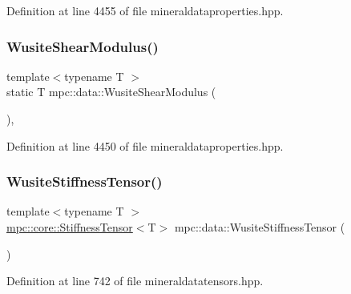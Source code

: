 Definition at line 4455 of file mineraldataproperties.\+hpp.

\mbox{\label{namespacempc_1_1data_a93bda58f4ced43c1b4ea8885f40eb3c9}} 
\subsubsection{\texorpdfstring{Wusite\+Shear\+Modulus()}{WusiteShearModulus()}}
{\footnotesize\ttfamily template$<$typename T $>$ \\
static T mpc\+::data\+::\+Wusite\+Shear\+Modulus (\begin{DoxyParamCaption}{ }\end{DoxyParamCaption})\hspace{0.3cm}{\ttfamily [inline]}, {\ttfamily [static]}}



Definition at line 4450 of file mineraldataproperties.\+hpp.

\mbox{\label{namespacempc_1_1data_a6600e136fcd24a2952392dc953bd2559}} 
\subsubsection{\texorpdfstring{Wusite\+Stiffness\+Tensor()}{WusiteStiffnessTensor()}}
{\footnotesize\ttfamily template$<$typename T $>$ \\
\mbox{\hyperlink{structmpc_1_1core_1_1_stiffness_tensor}{mpc\+::core\+::\+Stiffness\+Tensor}}$<$T$>$ mpc\+::data\+::\+Wusite\+Stiffness\+Tensor (\begin{DoxyParamCaption}{ }\end{DoxyParamCaption})}



Definition at line 742 of file mineraldatatensors.\+hpp.

\mbox{\label{namespacempc_1_1data_a995cce064e4e6d2f7870e35d41f467b1}} 
